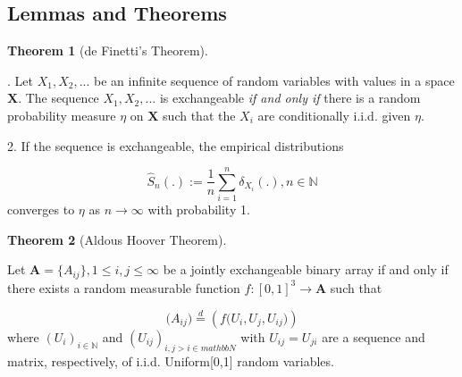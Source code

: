 \documentclass[12pt]{article}
\theoremstyle{definition}
\newtheorem{theorem}{Theorem}[section]
\begin{document}
\newpage
\subsection{Lemmas and Theorems}
	
\begin{theorem}[de Finetti's Theorem] 
	\label{finetti}
	
. Let $X_{1}, X_{2}, ...$ be an infinite sequence of random variables with values in a space $\mathbf{X}$. The sequence $X_{1}, X_{2}, ...$ is exchangeable \textit{if and only if} there is a random probability measure $\eta$ on $\mathbf{X}$ such that the $X_{i}$ are conditionally i.i.d. given $\eta$. 
		
2. If the sequence is exchangeable, the empirical distributions
		
$$\hat{S}_{n} ( . ) := \frac{1}{n} \sum\limits_{i=1}^{n} \delta_{X_{i}} ( .), n \in \mathbb{N}$$
		converges to $\eta$ as $n \rightarrow \infty$ with probability 1.
\end{theorem}
	
\begin{theorem}[Aldous Hoover Theorem]
		\label{Aldous_Hoover}
		
		Let $\mathbf{A} = \{A_{ij}\}, 1 \leq i,j \leq \infty$ be a jointly exchangeable binary array if and only if there exists a random measurable function $f : [0,1]^{3} \rightarrow \mathbf{A}$ such that 
		
		\begin{equation}
		\big(  A_{ij}  \big) \stackrel{d}{=} \left( f \big( U_{i}, U_{j}, U_{ij} \big)  \right)
		\end{equation}
		where $(U_{i})_{i \in \mathbb{N}}$ and $(U_{ij})_{i,j > i \in mathbb{N}}$ with $U_{ij} = U_{ji}$ are a sequence and matrix, respectively, of i.i.d. Uniform[0,1] random variables. 
\end{theorem}
	
	
	
\end{document}
